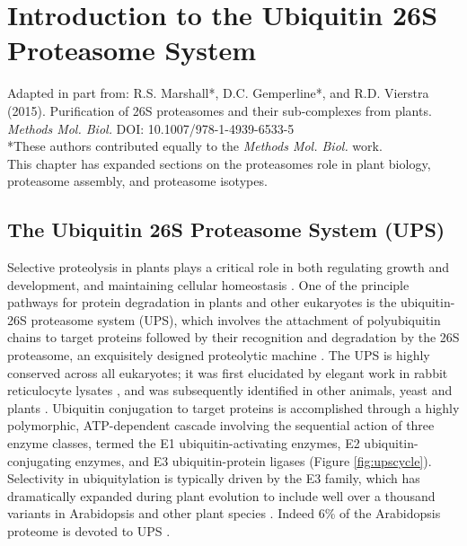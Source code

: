 \chapter{Introduction to the Ubiquitin 26S Proteasome System}

Adapted in part from: R.S. Marshall*, D.C. Gemperline*, and R.D. Vierstra (2015). Purification of 26S proteasomes and their sub-complexes from plants. \textit{Methods Mol. Biol.} DOI: 10.1007/978-1-4939-6533-5 \\

\noindent
*These authors contributed equally to the \textit{Methods Mol. Biol.} work. \\

\noindent
This chapter has expanded sections on the proteasomes role in plant biology, proteasome assembly, and proteasome isotypes. \\

\section{The Ubiquitin 26S Proteasome System (UPS)}
	Selective proteolysis in plants plays a critical role in both regulating growth and development, and maintaining cellular homeostasis \citep{nelson14, smalle04, vierstra93, vierstra09}.  One of the principle pathways for protein degradation in plants and other eukaryotes is the ubiquitin-26S proteasome system (UPS), which involves the attachment of polyubiquitin chains to target proteins followed by their recognition and degradation by the 26S proteasome, an exquisitely designed proteolytic machine \citep{bhattacharyya14, finley09, vierstra09}.  The UPS is highly conserved across all eukaryotes; it was first elucidated by elegant work in rabbit reticulocyte lysates \citep{ciechanover80, ciechanover80-frAQB, etlinger77, hershko80, wilkinson80}, and was subsequently identified in other animals, yeast and plants \citep{ciechanover84, finley84, finley87, glotzer91, hochstrasser91, shanklin87}.  Ubiquitin conjugation to target proteins is accomplished through a highly polymorphic, ATP-dependent cascade involving the sequential action of three enzyme classes, termed the E1 ubiquitin-activating enzymes, E2 ubiquitin-conjugating enzymes, and E3 ubiquitin-protein ligases \citep{berndsen14, smalle04, vierstra09} (Figure \ref{fig:upscycle}).  Selectivity in ubiquitylation is typically driven by the E3 family, which has dramatically expanded during plant evolution to include well over a thousand variants in Arabidopsis and other plant species \citep{hua13, hua11}. Indeed 6\% of the Arabidopsis proteome is devoted to UPS \citep{smalle04}. 

